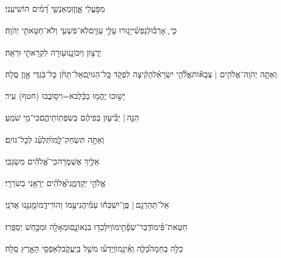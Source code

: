 \documentclass[12pt]{article}
\newcommand{\loc}[1]{\textsuperscript{\locf{#1}}}
\begin{document}
{\loc{ ג}~}‏ מִפֹּ֣עֲלֵי אָ֑וֶן{\hfill}וּֽמֵאַנְשֵׁ֥י דָ֝מִ֗ים הוֹשִׁיעֵֽנִי׃\par

{\loc{ ד}~}‏כִּ֤י ֪ אָרְב֡וּ{\hfill}לְנַפְשִׁ֗י\newline\hspace*{.5em}יָג֣וּרוּ עָלַ֣י עַזִּ֑ים{\hfill}לֹֽא־פִשְׁעִ֖י וְלֹא־חַטָּאתִ֣י יְהֹוָֽה׃\par

{\loc{ ה}~}‏ יְרֻצ֣וּן וְיִכּוֹנָ֑נוּ{\hfill}ע֖וּרָה לִקְרָאתִ֣י וּרְאֵֽה׃\par

{\loc{ ו}~}‏וְאַתָּ֤ה יְהֹוָֽה־אֱלֹהִ֥ים | צְבָא֡וֹת{\hfill}אֱלֹ֘הֵ֤י יִשְׂרָאֵ֗ל\newline\hspace*{.5em}הָקִ֗יצָה לִפְקֹ֥ד כׇּֽל־הַגּוֹיִ֑ם{\hfill}אַל־תָּחֹ֨ן כׇּל־בֹּ֖גְדֵי אָ֣וֶן סֶֽלָה׃\par

{\loc{ ז}~}‏יָשׁ֣וּבוּ  יֶהֱמ֥וּ כַכָּ֗לֶב{\hfill}א=וִיס֥וֹבֲבוּ (חטף) עִֽיר׃\par

{\loc{ ח}~}‏הִנֵּ֤ה |  יַבִּ֘יע֤וּן בְּפִיהֶ֗ם{\hfill} בְּשִׂפְתֽוֹתֵיהֶ֑ם{\hfill}כִּי־מִ֥י שֹׁמֵֽעַ׃\par

{\loc{ ט}~}‏וְאַתָּ֣ה  תִּשְׂחַק־לָ֑מוֹ{\hfill}תִּ֝לְעַ֗ג לְכׇל־גּוֹיִֽם׃\par

{\loc{ י}~}‏ אֵלֶ֣יךָ אֶשְׁמֹ֑רָה{\hfill}כִּֽי־אֱ֝לֹהִ֗ים מִשְׂגַּבִּֽי׃\par

{\loc{ יא}~}‏אֱלֹהֵ֣י  יְקַדְּמֵ֑נִי{\hfill}אֱ֝לֹהִ֗ים יַרְאֵ֥נִי בְשֹׁרְרָֽי׃\par

{\loc{ יב}~}‏אַל־תַּהַרְגֵ֤ם |  פֶּֽן־יִשְׁכְּח֬וּ עַמִּ֗י{\hfill}הֲנִיעֵ֣מוֹ  וְהוֹרִידֵ֑מוֹ{\hfill}מָ֖גִנֵּ֣נוּ אֲדֹנָֽי׃\par

{\loc{ יג}~}‏חַטַּאת־פִּ֗ימוֹ{\hfill}דְּֽבַר־שְׂפָ֫תֵ֥ימוֹ\newline\hspace*{.5em}וְיִלָּכְד֥וּ בִגְאוֹנָ֑ם{\hfill}וּמֵאָלָ֖ה וּמִכַּ֣חַשׁ יְסַפֵּֽרוּ׃\par

{\loc{ יד}~}‏כַּלֵּ֥ה בְחֵמָה֮{\hfill}כַּלֵּ֢ה וְֽאֵ֫ינֵ֥מוֹ\newline\hspace*{.5em}וְֽיֵדְע֗וּ  מֹשֵׁ֣ל בְּֽיַעֲקֹ֑ב{\hfill}לְאַפְסֵ֖י הָאָ֣רֶץ סֶֽלָה׃\par
\end{document}
